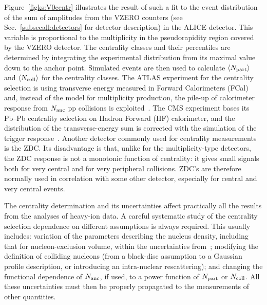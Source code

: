 Figure~\ref{figks:V0centr} illustrates the result of such a fit to the event distribution of the sum of amplitudes from the VZERO counters (see Sec.~\ref{subsecall:detectors} for detector description) in the ALICE detector. This variable is proportional to the multiplicity in the pseudorapidity region covered by the VZERO detector. The centrality classes and their percentiles are determined by integrating the experimental distribution from its maximal value down to the anchor point. Simulated events are then used to calculate $\langle N_{\rm part} \rangle$ and $\langle N_{\rm coll} \rangle$ for the centrality classes. The ATLAS experiment for the centrality selection is using transverse energy measured in Forward Calorimeters (FCal) and, instead of the model for multiplicity production, the pile-up of calorimeter response from $N_{\rm anc}$ pp collisions is exploited~\cite{ATLAS:2011ag}. The CMS experiment bases its Pb--Pb centrality selection on Hadron Forward (HF) calorimeter, and the distribution of the transverse-energy sum is corrected with the simulation of the trigger response~\cite{Chatrchyan:2011pb}. Another detector commonly used for centrality measurements is the ZDC. Its disadvantage is that, unlike for the multiplicity-type detectors, the ZDC response is not a monotonic function of centrality: it gives small signals both for very central and for very peripheral collisions. ZDC's are therefore normally used in correlation with some other detector, especially for central and very central events.

The centrality determination and its uncertainties affect practically all the results from the analyses of heavy-ion data. A careful systematic study of the centrality selection dependence on different assumptions is always required. This usually includes: variation of the parameters describing the nucleus density, including that for nucleon-exclusion volume, within the uncertainties from~\cite{DeJager:1987qc}; modifying the definition of colliding nucleons (from a black-disc assumption to a Gaussian profile description, or introducing an intra-nuclear rescattering); and changing the functional dependence of $N_{\rm anc}$, if used, to a power function of $N_{\rm part}$ or $N_{\rm coll}$. All these uncertainties must then be properly propagated to the measurements of other quantities.

